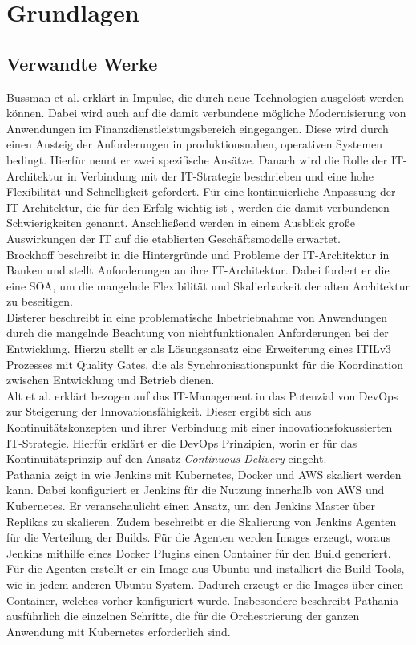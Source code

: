 \chapter{Grundlagen}

\section{Verwandte Werke}
Bussman et al. erklärt in \cite{Bussmann2006} Impulse, die durch neue Technologien ausgelöst werden können. Dabei wird auch auf die damit verbundene mögliche Modernisierung von Anwendungen im Finanzdienstleistungsbereich eingegangen. Diese wird durch einen Ansteig der Anforderungen in produktionsnahen, operativen Systemen \cite{Bussmann2006, Brockhoff2006} bedingt. Hierfür nennt er zwei spezifische Ansätze. Danach wird die Rolle der IT-Architektur in Verbindung mit der IT-Strategie beschrieben und eine hohe Flexibilität und Schnelligkeit gefordert. Für eine kontinuierliche Anpassung der IT-Architektur, die für den Erfolg wichtig ist \cite{Bussmann2006}, werden die damit verbundenen Schwierigkeiten genannt. Anschließend werden in einem Ausblick große Auswirkungen der IT auf die etablierten Geschäftsmodelle erwartet. 
\medskip
\\
Brockhoff beschreibt in \cite{Brockhoff2006} die Hintergründe und Probleme der IT-Architektur in Banken und stellt Anforderungen an ihre IT-Architektur. Dabei fordert er die eine \ac{SOA}, um die mangelnde Flexibilität und Skalierbarkeit der alten Architektur zu beseitigen.
\medskip
\\
Disterer beschreibt in \cite{mci/Disterer2011} eine problematische Inbetriebnahme von Anwendungen durch die mangelnde Beachtung von nichtfunktionalen Anforderungen bei der Entwicklung. Hierzu stellt er als Lösungsansatz eine Erweiterung eines ITILv3 Prozesses mit Quality Gates, die als Synchronisationspunkt für die Koordination zwischen Entwicklung und Betrieb dienen.
\medskip
\\
Alt et al. erklärt bezogen auf das IT-Management in \cite{Alt2017} das Potenzial von DevOps zur Steigerung der Innovationsfähigkeit. Dieser ergibt sich aus Kontinuitätskonzepten und ihrer Verbindung mit einer inoovationsfokussierten IT-Strategie. Hierfür erklärt er die DevOps Prinzipien, worin er für das Kontinuitätsprinzip auf den Ansatz \emph{Continuous Delivery} eingeht.
\medskip
\\
Pathania zeigt in \cite{Pathania2017} wie Jenkins mit Kubernetes, Docker und \ac{AWS} skaliert werden kann. Dabei konfiguriert er Jenkins für die Nutzung innerhalb von \ac{AWS} und Kubernetes. Er veranschaulicht einen Ansatz, um den Jenkins Master über Replikas zu skalieren. Zudem beschreibt er die Skalierung von Jenkins Agenten für die Verteilung der Builds. Für die Agenten werden Images erzeugt, woraus Jenkins mithilfe eines Docker Plugins einen Container für den Build generiert. Für die Agenten erstellt er ein Image aus Ubuntu und installiert die Build-Tools, wie in jedem anderen Ubuntu System.
Dadurch erzeugt er die Images über einen Container, welches vorher konfiguriert wurde. Insbesondere beschreibt Pathania ausführlich die einzelnen Schritte, die für die Orchestrierung der ganzen Anwendung mit Kubernetes erforderlich sind.

